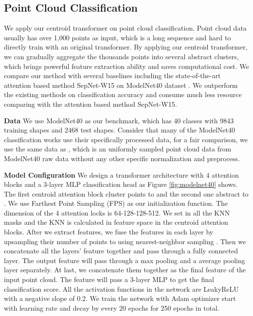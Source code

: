 \documentclass[english]{article}
\begin{document}
\subsection{Point Cloud Classification}
We apply our centroid transformer on point cloud classification.
Point cloud data usually has over 1,000 points as input, which is a long sequence and hard to directly train with an original transformer.
By applying our centroid transformer, we can gradually aggregate the thousands points into several abstract clusters, which brings powerful feature extraction ability and saves computational cost.
We compare our method with several baselines including the state-of-the-art attention based method SepNet-W15 \citep{ran2020deeper} on ModelNet40 dataset \citep{wu20153d}. We outperform the existing methods on classification accuracy and consume much less resource comparing with the attention based method SepNet-W15.



\textbf{Data} \space We use ModelNet40 as our benchmark, which has 40 classes with 9843 training shapes and 2468 test shapes. Consider that many of the ModelNet40 classification works use their specifically processed data, for a fair comparison, we use the same data as \citep{qi2017pointnet}, which is an uniformly sampled point cloud data from ModelNet40 raw data without any other specific normalization and preprocess.

\textbf{Model Configuration} \space We design a transformer architecture with 4 attention blocks and a 3-layer MLP classification head as Figure \ref{fig:modelnet40} shows. The first centroid attention block cluster  points to  and the second one abstract  to . We use Farthest Point Sampling (FPS) as our initialization function.  The dimension of the 4 attention locks is 64-128-128-512. We set  in all the KNN masks and the KNN is calculated in feature space in the centroid attention blocks.  After we extract features, we fuse the features in each layer by upsampling their number of points to  using nearest-neighbor sampling . Then we concatenate all the layers' feature together and pass through a fully connected layer. The output feature will pass through a max pooling and a average pooling layer separately. At last, we concatenate them together as the final feature of the input point cloud. The feature will pass a 3-layer MLP to get the final classification score. All the activation functions in the network are LeakyReLU with a negative slope of 0.2. We train the network with Adam optimizer start with  learning rate and decay by  every 20 epochs for 250 epochs in total.
\end{document}
